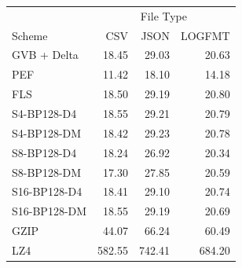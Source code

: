 \begin{tabular}{lrrr}
\toprule
 & \multicolumn{3}{c}{File Type} \\
Scheme & CSV & JSON & LOGFMT \\
\midrule
GVB + Delta & 18.45 & 29.03 & 20.63 \\
PEF & 11.42 & 18.10 & 14.18 \\
FLS & 18.50 & 29.19 & 20.80 \\
S4-BP128-D4 & 18.55 & 29.21 & 20.79 \\
S4-BP128-DM & 18.42 & 29.23 & 20.78 \\
S8-BP128-D4 & 18.24 & 26.92 & 20.34 \\
S8-BP128-DM & 17.30 & 27.85 & 20.59 \\
S16-BP128-D4 & 18.41 & 29.10 & 20.74 \\
S16-BP128-DM & 18.55 & 29.19 & 20.69 \\
GZIP & 44.07 & 66.24 & 60.49 \\
LZ4 & 582.55 & 742.41 & 684.20 \\
\bottomrule
\end{tabular}

